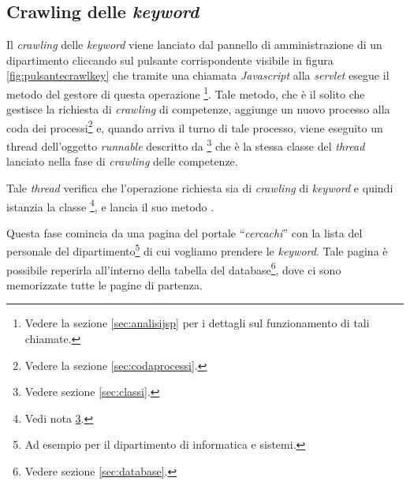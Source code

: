 \documentclass[tesi.tex]{subfiles}
\begin{document}
\subsection{Crawling delle \emph{keyword}}\label{sec:crawlingkey}
Il \emph{crawling} delle \emph{keyword} viene lanciato dal pannello di
amministrazione di un dipartimento cliccando sul pulsante
corrispondente visibile in figura \ref{fig:pulsantecrawlkey}
che tramite una chiamata \emph{Javascript} alla
\emph{servlet} esegue il metodo  del
gestore di questa operazione \footnote{Vedere la sezione \ref{sec:analisijsp} per i
  dettagli sul funzionamento di tali chiamate.}.
Tale metodo, che \`e il solito che gestisce la richiesta di
\emph{crawling} di competenze, aggiunge un nuovo processo alla coda
dei processi\footnote{Vedere la sezione \ref{sec:codaprocessi}.} e,
quando arriva il turno di tale processo, viene eseguito un thread
dell'oggetto \emph{runnable} descritto da
\footnote{Vedere sezione \ref{sec:classi}\label{note:vediclassi}.}
che \`e la stessa classe del \emph{thread} lanciato nella fase di
\emph{crawling} delle competenze.

Tale \emph{thread} verifica che l'operazione richiesta sia di
\emph{crawling} di \emph{keyword} e quindi istanzia la classe
\footnote{Vedi nota
  \ref{note:vediclassi}.}, e lancia il suo metodo .

Questa fase comincia da una pagina del portale ``\emph{cercachi}'' con la
lista del personale del dipartimento\footnote{Ad esempio
  per il dipartimento di informatica e sistemi.} di cui vogliamo
prendere le \emph{keyword}. Tale pagina \`e possibile reperirla
all'interno della tabella  del
database\footnote{Vedere sezione \ref{sec:database}\label{note:vedidatabase}.}, dove ci sono
memorizzate tutte le pagine di partenza.
\end{document}
